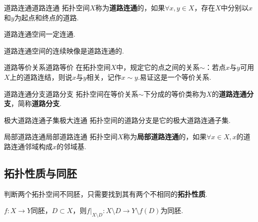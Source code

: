 \documentclass{ctexart}
\begin{document}
\begin{定义}{道路连通}{道路连通}
	拓扑空间$X$称为\textbf{道路连通}的，如果$\forall x,y \in X$，存在$X$中分别以$x$和$y$为起点和终点的道路.
\end{定义}
\begin{命题}{}{}
	道路连通空间一定连通.
\end{命题}
\begin{命题}{}{}
	道路连通空间的连续映像是道路连通的.
\end{命题}
\begin{定义}{道路等价关系}{道路等价}
	在拓扑空间$X$中，规定它的点之间的关系$\sim $：若点$x$与$y$可用$X$上的道路连结，则说$x$与$y$相关，记作$x \sim y.$易证这是一个等价关系.
\end{定义}
\begin{定义}{道路连通分支}{道路分支}
	拓扑空间在等价关系$\sim$下分成的等价类称为$X$的\textbf{道路连通分支}，简称\textbf{道路分支}.
\end{定义}
\begin{命题}{极大道路连通子集}{极大连通}
	拓扑空间的道路分支是它的极大道路连通子集.
\end{命题}
\begin{定义}{局部道路连通}{局部道路连通}
	拓扑空间$X$称为\textbf{局部道路连通}的，如果$\forall x \in X, x$的道路连通邻域构成$x$的邻域基.
\end{定义}
\subsection{拓扑性质与同胚}
判断两个拓扑空间不同胚，只需要找到其有两个不相同的\textbf{拓扑性质}.
\begin{定理}{}{}
	$f:X\rightarrow Y$同胚，$D\subset X$，则$f|_{X\setminus D}:X\setminus D\to Y\setminus f(D)$为同胚.
\end{定理}


\printindex
\end{document}
